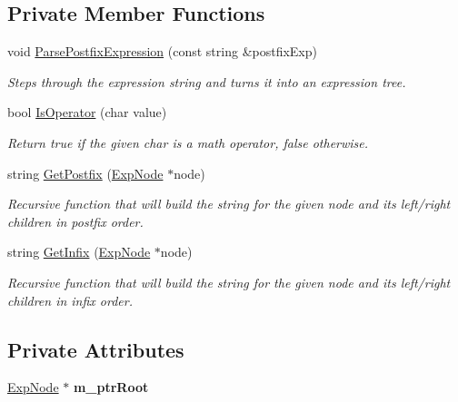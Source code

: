 \subsection*{Private Member Functions}
\begin{DoxyCompactItemize}
\item 
void \hyperlink{classExpression_a0fdef693c4d3742175598aef752689f4}{Parse\+Postfix\+Expression} (const string \&postfix\+Exp)
\begin{DoxyCompactList}\small\item\em Steps through the expression string and turns it into an expression tree. \end{DoxyCompactList}\item 
bool \hyperlink{classExpression_ae2784e1d7ea958a06e5e5ccadcf1d0dd}{Is\+Operator} (char value)\hypertarget{classExpression_ae2784e1d7ea958a06e5e5ccadcf1d0dd}{}\label{classExpression_ae2784e1d7ea958a06e5e5ccadcf1d0dd}

\begin{DoxyCompactList}\small\item\em Return true if the given char is a math operator, false otherwise. \end{DoxyCompactList}\item 
string \hyperlink{classExpression_a39330fd10347a8fa4314e38d1f9237ff}{Get\+Postfix} (\hyperlink{classExpNode}{Exp\+Node} $\ast$node)
\begin{DoxyCompactList}\small\item\em Recursive function that will build the string for the given node and its left/right children in postfix order. \end{DoxyCompactList}\item 
string \hyperlink{classExpression_a444a845069c98d72484edf46017813ec}{Get\+Infix} (\hyperlink{classExpNode}{Exp\+Node} $\ast$node)
\begin{DoxyCompactList}\small\item\em Recursive function that will build the string for the given node and its left/right children in infix order. \end{DoxyCompactList}\end{DoxyCompactItemize}
\subsection*{Private Attributes}
\begin{DoxyCompactItemize}
\item 
\hyperlink{classExpNode}{Exp\+Node} $\ast$ {\bfseries m\+\_\+ptr\+Root}\hypertarget{classExpression_a021a7a29ab58b04a03d19ff878dbe606}{}\label{classExpression_a021a7a29ab58b04a03d19ff878dbe606}

\end{DoxyCompactItemize}


